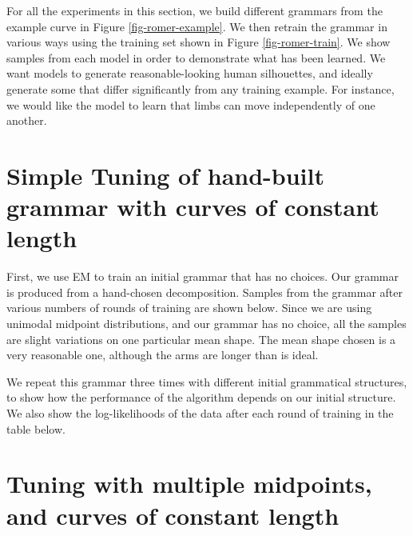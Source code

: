 
For all the experiments in this section, we build different grammars
from the example curve in Figure \ref{fig-romer-example}. We then
retrain the grammar in various ways using the training set shown in
Figure \ref{fig-romer-train}. We show samples from each model in order
to demonstrate what has been learned. We want models to generate
reasonable-looking human silhouettes, and ideally generate some that
differ significantly from any training example. For instance, we would
like the model to learn that limbs can move independently of one
another.




\section{Simple Tuning of hand-built grammar with curves of constant length}

First, we use EM to train an initial grammar that has no choices. Our
grammar is produced from a hand-chosen decomposition. Samples from the
grammar after various numbers of rounds of training are shown
below. Since we are using unimodal midpoint distributions, and our
grammar has no choice, all the samples are slight variations on one
particular mean shape. The mean shape chosen is a very reasonable one,
although the arms are longer than is ideal.

We repeat this grammar three times with different initial grammatical
structures, to show how the performance of the algorithm depends on
our initial structure. We also show the log-likelihoods of the data
after each round of training in the table below.



\section{Tuning with multiple midpoints, and curves of constant length}

